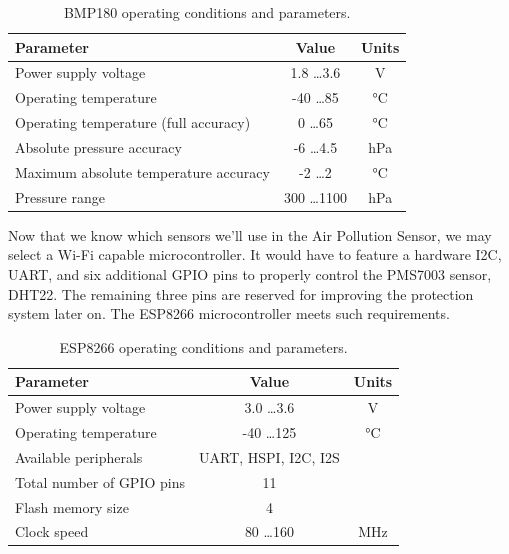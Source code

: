 \documentclass{article}
\begin{document}
			\begin{table}[h]
				\begin{center}
					\caption{BMP180 operating conditions and parameters.}
					\label{tab:bmp180-params}
					\begin{tabular}{l|c|c}
						\textbf{Parameter} & \textbf{Value} & \textbf{Units} \\
						\hline
						
						Power supply voltage & 1.8 \ldots 3.6 & \si{\volt} \\
						Operating temperature & -40 \ldots 85 & \si{\celsius} \\
						Operating temperature (full accuracy) & 0 \ldots 65 & \si{\celsius} \\
						Absolute pressure accuracy & -6 \ldots 4.5 & \si{\hecto\pascal} \\
						Maximum absolute temperature accuracy & -2 \ldots 2 & \si{\celsius} \\
						Pressure range & 300 \ldots 1100 & \si{\hecto\pascal} \\
					\end{tabular}
				\end{center}
			\end{table}
			
			Now that we know which sensors we'll use in the Air Pollution Sensor, we may select a Wi-Fi capable microcontroller. It would have to feature a hardware I2C, UART, and six additional GPIO pins to properly control the PMS7003 sensor, DHT22. The remaining three pins are reserved for improving the protection system later on. The ESP8266 microcontroller meets such requirements.
			
			\begin{table}[h]
				\begin{center}
					\caption{ESP8266 operating conditions and parameters.}
					\label{tab:esp8266-params}
					\begin{tabular}{l|c|c}
						\textbf{Parameter} & \textbf{Value} & \textbf{Units} \\
						\hline
						
						Power supply voltage & 3.0 \ldots 3.6 & \si{\volt} \\
						Operating temperature & -40 \ldots 125 & \si{\celsius} \\
						Available peripherals & UART, HSPI, I2C, I2S \\
						Total number of GPIO pins & 11 & \\
						Flash memory size & 4 & \si{\mega\byte} \\
						Clock speed & 80 \ldots 160 & \si{\MHz} \\
					\end{tabular}
				\end{center}
			\end{table}
			
\end{document}
